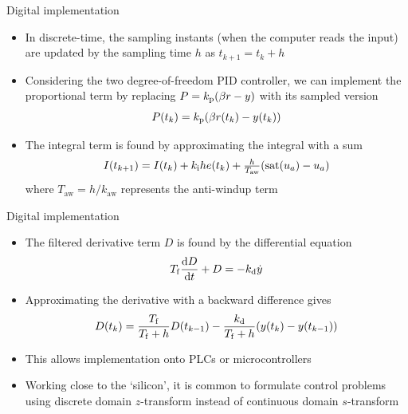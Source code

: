\documentclass[10pt]{beamer-control}
\begin{document}
\begin{frame}{Digital implementation}
	\begin{itemize}
		\item In discrete-time, the sampling instants (when the computer reads the input) are updated by the sampling time $h$ as $t_{k+1}=t_k+h$
		\item Considering the two degree-of-freedom PID controller, we can implement the proportional term by replacing $P=k_{\mathrm{p}}(\beta r-y)$ with its sampled version
		\begin{equation}P(t_k) = k_{\mathrm{p}} (\beta r(t_k)-y(t_k))\end{equation}
		\item The integral term is found by approximating the integral with a sum
		\begin{equation}I(t_{k+1}) = I(t_k)+k_{\mathrm{i}} h e(t_k) + \tfrac{h}{T_{\text{aw}}} (\operatorname{sat}(u_a)-u_a)\end{equation}
		where $T_{\text{aw}}=h/k_{\text{aw}}$ represents the anti-windup term
	\end{itemize}
\end{frame}

\begin{frame}{Digital implementation}
	\begin{itemize}
		\item The filtered derivative term $D$ is found by the differential equation
		\begin{equation}T_{\mathrm{f}} \frac{\mathrm{d}D}{\mathrm{d} t} + D = -k_{\mathrm{d}} \dot{y}\end{equation}
		\item Approximating the derivative with a backward difference gives
		\begin{equation}D(t_k) = \frac{T_{\mathrm{f}}}{T_{\mathrm{f}}+h} D(t_{k-1})-\frac{k_{\mathrm{d}}}{T_{\mathrm{f}}+h}(y(t_k)-y(t_{k-1}))  \end{equation}
		\item This allows implementation onto PLCs or microcontrollers
		\item Working close to the `silicon', it is common to formulate control problems using \alert{discrete domain} $z$-transform instead of continuous domain $s$-transform
	\end{itemize}
\end{frame}
\end{document}
